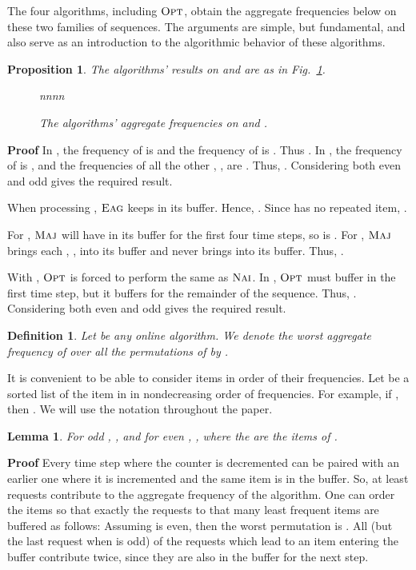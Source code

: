 \documentclass[11pt]{article}
\newtheorem{xdefinition}{Definition}
\newtheorem{xlemma}{Lemma}
\newtheorem{xproposition}{Proposition}
\newenvironment{definition}{\begin{xdefinition}\rm}{\hspace*{\fill}\raisebox{-1pt}{\boldmath}\end{xdefinition}}
\newenvironment{lemma}{\begin{xlemma}\rm}{\end{xlemma}}
\newenvironment{proposition}{\begin{xproposition}\rm}{\end{xproposition}}
\newenvironment{proof}{\begin{trivlist}\item[]{\bf Proof }}{\hspace*{\fill}\raisebox{-1pt}{\boldmath}\end{trivlist}}
\newcommand{\opt}{{\ensuremath{\textsc{Opt}}}\xspace}
\newcommand{\maj}{{\ensuremath{\textsc{Maj}}}\xspace}
\newcommand{\nav}{{\ensuremath{\textsc{Nai}}}\xspace}
\newcommand{\eag}{{\ensuremath{\textsc{Eag}}}\xspace}
\begin{document}
The four algorithms, including \opt,
obtain the aggregate frequencies below on these two families of sequences.
The arguments are simple, but fundamental, and also serve as an
introduction to the algorithmic behavior of these algorithms.
\begin{proposition}\label{prop_sequences}
The algorithms' results on  and  are as in
Fig.~\ref{fig-profit}.
\begin{figure}[ht]
\begin{center}
nnnn
\end{center}
\caption{The algorithms' aggregate frequencies on  and .}
\label{fig-profit}
\end{figure}
\end{proposition}
\begin{proof}
In , the frequency of  is  and the frequency of  is .
Thus .
In , the frequency of  is , and the frequencies of all the other , , are . Thus, . Considering both even and odd  gives the required result.

When processing , \eag keeps  in its buffer. Hence, .
Since  has no repeated item, .

For , \maj will have  in its buffer for the first four time steps, so  is . For , \maj brings each , , into its buffer and never brings  into its buffer. Thus, .

With , \opt is forced to perform the same as \nav.
In , \opt must buffer  in the first time step, but it buffers  for the remainder of the sequence. Thus, . Considering both even and odd  gives the required result.
\end{proof}




\begin{definition}\label{def:worstpermut}
Let  be any online algorithm.
We denote the worst aggregate frequency of  
over all the
permutations  of  by
.
\end{definition}
It is convenient to be able to consider items in order of their
frequencies.
Let  be a sorted list of the item
in  in nondecreasing order of frequencies.
For example, if , then .
We will use the notation  throughout the paper.
\begin{lemma}\label{lem:wmaj}
For odd ,
 ,
and for even ,
,
where the  are the items of .
\end{lemma}
\begin{proof}
Every time step where the counter is decremented can be paired with an
earlier one
where it is incremented and the same item is in the buffer.
So, at least  requests contribute to the aggregate frequency of the algorithm.
One can order the items so that exactly the 
requests to that many least frequent items are buffered as follows:
Assuming  is even, then the worst permutation is .
All  (but the last request when  is odd) of the requests which lead
to an item entering the buffer contribute twice, since they are also in
the buffer for the next step.
\end{proof}
\end{document}
